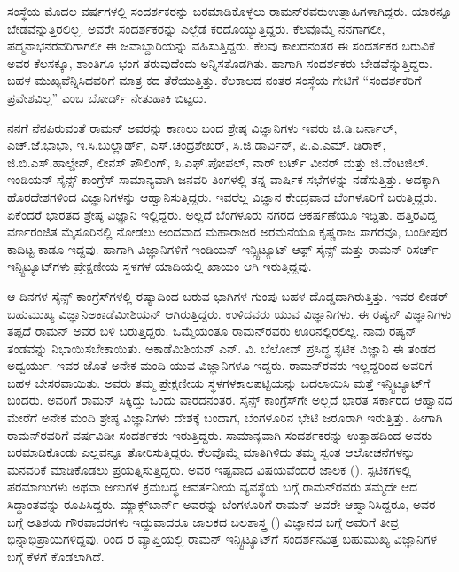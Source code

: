 ಸಂಸ್ಥೆಯ ಮೊದಲ ವರ್ಷಗಳಲ್ಲಿ ಸಂದರ್ಶಕರನ್ನು ಬರಮಾಡಿಕೊಳ್ಳಲು ರಾಮನ್‍ರವರು\break ಉತ್ಸಾಹಿಗಳಾಗಿದ್ದರು. ಯಾರನ್ನೂ ಬೇಡವೆನ್ನುತ್ತಿರಲಿಲ್ಲ. ಅವರೇ ಸಂದರ್ಶಕರನ್ನು ಎಲ್ಲೆಡೆ ಕರದೊಯ್ಯುತ್ತಿದ್ದರು. ಕೆಲವೊಮ್ಮೆ ನನಗಾಗಲೀ, ಪದ್ಮನಾಭನರವರಿಗಾಗಲೀ ಈ ಜವಾಬ್ದಾರಿಯನ್ನು ವಹಿಸುತ್ತಿದ್ದರು. ಕೆಲವು ಕಾಲದನಂತರ ಈ ಸಂದರ್ಶಕರ ಬರುವಿಕೆ ಅವರ ಕೆಲಸಕ್ಕೂ, ಶಾಂತಿಗೂ ಭಂಗ ತರುವುದೆಂದು ಅನ್ನಿಸತೊಡಗಿತು. ಹಾಗಾಗಿ ಸಂದರ್ಶಕರು ಬೇಡವೆನ್ನುತ್ತಿದ್ದರು. ಬಹಳ ಮುಖ್ಯವೆನ್ನಿಸಿದವರಿಗೆ ಮಾತ್ರ ಕದ ತೆರೆಯುತ್ತಿತ್ತು. ಕೆಲಕಾಲದ ನಂತರ ಸಂಸ್ಥೆಯ ಗೇಟಿಗೆ “ಸಂದರ್ಶಕರಿಗೆ ಪ್ರವೇಶವಿಲ್ಲ” ಎಂಬ ಬೋರ್ಡ್ ನೇತುಹಾಕಿ ಬಿಟ್ಟರು.

ನನಗೆ ನೆನಪಿರುವಂತೆ ರಾಮನ್ ಅವರನ್ನು ಕಾಣಲು ಬಂದ ಶ್ರೇಷ್ಠ ವಿಜ್ಞಾನಿಗಳು ಇವರು\enginline{-} ಜಿ.ಡಿ.ಬರ್ನಾಲ್, ಎಚ್.ಜೆ.ಭಾಭಾ, ಇ.ಸಿ.ಬುಲ್ಲಾರ್ಡ್, ಎಸ್.ಚಂದ್ರಶೇಖರ್, ಸಿ.ಜಿ.ಡಾರ್ವಿನ್, ಪಿ.ಎ.ಎಮ್. ಡಿರಾಕ್, ಜಿ.ಬಿ.ಎಸ್.ಹಾಲ್ಡೇನ್, ಲೀನಸ್ ಪೌಲಿಂಗ್, ಸಿ.ಎಫ್.ಪೋಪಲ್, ನಾರ್ ಬರ್ಟ್ ವೀನರ್ ಮತ್ತು ಜಿ.ವೆಂಟಜಿಲ್. ಇಂಡಿಯನ್ ಸೈನ್ಸ್ ಕಾಂಗ್ರೆಸ್ ಸಾಮಾನ್ಯವಾಗಿ ಜನವರಿ ತಿಂಗಳಲ್ಲಿ ತನ್ನ ವಾರ್ಷಿಕ ಸಭೆಗಳನ್ನು ನಡೆಸುತ್ತಿತ್ತು. ಅದಕ್ಕಾಗಿ ಹೊರದೇಶಗಳಿಂದ ವಿಜ್ಞಾನಿಗಳನ್ನು ಆಹ್ವಾನಿಸುತ್ತಿದ್ದರು. ಇವರೆಲ್ಲ ವಿಜ್ಞಾನ ಕೇಂದ್ರವಾದ ಬೆಂಗಳೂರಿಗೆ ಬರುತ್ತಿದ್ದರು. ಏಕೆಂದರೆ ಭಾರತದ ಶ್ರೇಷ್ಠ ವಿಜ್ಞಾನಿ ಇಲ್ಲಿದ್ದರು. ಅಲ್ಲದೆ ಬೆಂಗಳೂರು ನಗರದ ಆಕರ್ಷಣೆಯೂ ಇದ್ದಿತು. ಹತ್ತಿರವಿದ್ದ ವರ್ಣರಂಜಿತ ಮೈಸೂರಿನಲ್ಲಿ ನೋಡಲು ಅಂದವಾದ ಮಹಾರಾಜರ ಅರಮನೆಯೂ ಕೃಷ್ಣರಾಜ ಸಾಗರವೂ, ಬಂಡೀಪುರ ಕಾದಿಟ್ಟ ಕಾಡೂ ಇದ್ದವು. ಹಾಗಾಗಿ ವಿಜ್ಞಾನಿಗಳಿಗೆ ಇಂಡಿಯನ್ ಇನ್ಸ್ಟಿಟ್ಯೂಟ್ ಆಫ಼್ ಸೈನ್ಸ್ ಮತ್ತು ರಾಮನ್ ರಿಸರ್ಚ್ ಇನ್ಸ್ಟಿಟ್ಯೂಟ್‍ಗಳು ಪ್ರೇಕ್ಷಣೀಯ ಸ್ಥಳಗಳ ಯಾದಿಯಲ್ಲಿ ಖಾಯಂ ಆಗಿ ಇರುತ್ತಿದ್ದವು.

\newpage

ಆ ದಿನಗಳ ಸೈನ್ಸ್ ಕಾಂಗ್ರೆಸ್‍ಗಳಲ್ಲಿ ರಷ್ಯಾದಿಂದ ಬರುವ ಭಾಗಿಗಳ ಗುಂಪು ಬಹಳ ದೊಡ್ಡದಾಗಿರು\-ತ್ತಿತ್ತು. ಇವರ ಲೀಡರ್ ಬಹುಮುಖ್ಯ ವಿಜ್ಞಾನಿ\enginline{-}ಅಕಾಡೆಮೀಶಿಯನ್ ಆಗಿರುತ್ತಿದ್ದರು. ಉಳಿದವರು ಯುವ ವಿಜ್ಞಾನಿಗಳು. ಈ ರಷ್ಯನ್ ವಿಜ್ಞಾನಿಗಳು ತಪ್ಪದೆ ರಾಮನ್ ಅವರ ಬಳಿ ಬರುತ್ತಿದ್ದರು. ಒಮ್ಮೆಯಂತೂ ರಾಮನ್‍ರವರು ಊರಿನಲ್ಲಿರಲಿಲ್ಲ. ನಾವು ರಷ್ಯನ್ ತಂಡವನ್ನು ನಿಭಾಯಿಸ\-ಬೇಕಾಯಿತು. ಅಕಾಡೆಮಿಶಿಯನ್ ಎನ್. ವಿ. ಬೆಲೋವ್ ಪ್ರಸಿದ್ಧ ಸ್ಫಟಿಕ ವಿಜ್ಞಾನಿ ಈ ತಂಡದ ಅಧ್ವರ್ಯು. ಇವರ ಜೊತೆ ಅನೇಕ ಮಂದಿ ಯುವ ವಿಜ್ಞಾನಿಗಳೂ ಇದ್ದರು. ರಾಮನ್‍ರವರು ಇಲ್ಲದ್ದರಿಂದ ಅವರಿಗೆ ಬಹಳ ಬೇಸರವಾಯಿತು. ಅವರು ತಮ್ಮ ಪ್ರೇಕ್ಷಣೀಯ ಸ್ಥಳಗಳ\break ಕಾಲಪಟ್ಟಿಯನ್ನು ಬದಲಾಯಿಸಿ ಮತ್ತೆ ಇನ್ಸ್ಟಿಟ್ಯೂಟ್‍ಗೆ ಬಂದರು. ಅವರಿಗೆ ರಾಮನ್ ಸಿಕ್ಕಿದ್ದು ಒಂದು ವಾರದನಂತರ. ಸೈನ್ಸ್ ಕಾಂಗ್ರೆಸ್‍ಗೇ ಅಲ್ಲದೆ ಭಾರತ ಸರ್ಕಾರದ ಆಹ್ವಾನದ ಮೇರೆಗೆ ಅನೇಕ ಮಂದಿ ಶ್ರೇಷ್ಠ ವಿಜ್ಞಾನಿಗಳು ದೇಶಕ್ಕೆ ಬಂದಾಗ, ಬೆಂಗಳೂರಿನ ಭೇಟಿ ಜರೂರಾಗಿ ಇರುತ್ತಿತ್ತು. ಹೀಗಾಗಿ ರಾಮನ್‍ರವರಿಗೆ ವರ್ಷವಿಡೀ ಸಂದರ್ಶಕರು ಇರುತ್ತಿದ್ದರು. ಸಾಮಾನ್ಯವಾಗಿ ಸಂದರ್ಶಕರನ್ನು ಉತ್ಸಾಹದಿಂದ ಅವರು ಬರಮಾಡಿಕೊಂಡು ಎಲ್ಲವನ್ನೂ ತೋರಿಸುತ್ತಿದ್ದರು. ಕೆಲವೊಮ್ಮೆ ಮಾತಿಗಿಳಿದು ತಮ್ಮ ಸ್ವಂತ ಆಲೋಚನೆಗಳನ್ನು ಮನವರಿಕೆ ಮಾಡಿಕೊಡಲು ಪ್ರಯತ್ನಿಸುತ್ತಿದ್ದರು. ಅವರ ಇಷ್ಟವಾದ ವಿಷಯವೆಂದರೆ ಜಾಲಕ (). ಸ್ಪಟಿಕಗಳಲ್ಲಿ ಪರಮಾಣುಗಳು ಅಥವಾ ಅಣುಗಳ ಕ್ರಮಬದ್ಧ ಆವರ್ತನೀಯ ವ್ಯವಸ್ಥೆಯ ಬಗ್ಗೆ ರಾಮನ್‍ರವರು ತಮ್ಮದೇ ಆದ ಸಿದ್ಧಾಂತವನ್ನು ರೂಪಿಸಿದ್ದರು. ಮ್ಯಾಕ್ಸ್‌ಬಾರ್ನ್ ಅವರನ್ನು ಬೆಂಗಳೂರಿಗೆ ರಾಮನ್ ಅವರೇ ಆಹ್ವಾನಿಸಿದ್ದರೂ, ಅವರ ಬಗ್ಗೆ ಅತಿಶಯ ಗೌರವಾದರಗಳು ಇದ್ದುವಾದರೂ ಜಾಲಕದ ಬಲಶಾಸ್ತ್ರ () ವಿಜ್ಞಾನದ ಬಗ್ಗೆ ಅವರಿಗೆ ತೀವ್ರ ಭಿನ್ನಾಭಿಪ್ರಾಯಗಳಿದ್ದವು.  ರಿಂದ ರ ವ್ಯಾಪ್ತಿಯಲ್ಲಿ ರಾಮನ್ ಇನ್ಸ್ಟಿಟ್ಯೂಟ್‍ಗೆ ಸಂದರ್ಶನವಿತ್ತ ಬಹುಮುಖ್ಯ ವಿಜ್ಞಾನಿಗಳ ಬಗ್ಗೆ ಕೆಳಗೆ ಕೊಡಲಾಗಿದೆ.


